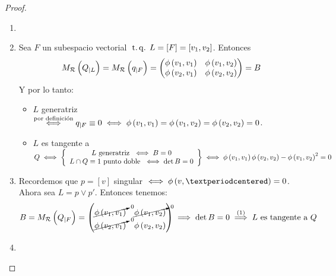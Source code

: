 \begin{proof}
 \begin{enumerate}[(1)]
  \item[]
  \item Sea $F$ un subespacio vectorial $\operatorname{\;t.q.\;} L=[F]=[v_1,v_2]$. Entonces
  \[
   M_{\mathcal{R}} \left( Q_{|L} \right) = M_{\mathcal{R}} \left( q_{|F}\right) =
   \begin{pmatrix}
    \phi\left( v_1,v_1\right) & \phi\left( v_1,v_2\right)\\
    \phi\left( v_2,v_1\right) & \phi\left( v_2,v_2\right)\\
   \end{pmatrix} =B
  \]
  Y por lo tanto:
  \begin{itemize}
   \item $L$ generatriz $\stackrel{\text{por definición}}{\iff} q_{|F}\equiv 0
   \iff \phi\left( v_1,v_1\right) = \phi\left( v_1,v_2\right) = \phi\left( v_2,v_2\right)=0$.
   \item $L$ es tangente a $Q \iff \left\{
   \begin{array}{c}
    L \text{ generatriz }  \iff B=0 \\
    L\cap Q \equiv 1 \text{ punto doble }  \iff \det B=0\\
   \end{array}\right\} \iff \phi\left( v_1,v_1\right) \phi\left( v_2,v_2\right) - \phi\left( v_1,v_2\right) ^2 =0$
  \end{itemize}
  \item Recordemos que $p=[v]$ singular $\iff \phi\lp v,·\rp=0$. Ahora sea $L=p\vee p'$.
  Entonces tenemos:
  \[
   B=M_{\mathcal{R}}\left( Q_{|F}\right) = 
   \begin{pmatrix}
    \cancelto{0}{\phi\left( v_1,v_1\right)} & \cancelto{0}{\phi\left( v_1,v_2\right)}\\
    \cancelto{0}{\phi\left( v_2,v_1\right)} & \phi\left( v_2,v_2\right)
   \end{pmatrix} \implies \det B=0 \stackrel{(1)}{\implies} L \text{ es tangente a } Q
  \]
  \item 
 \end{enumerate}
\end{proof}












